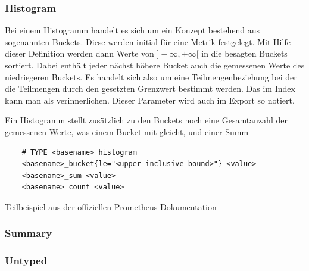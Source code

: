 \subsubsection{Histogram}
Bei einem Histogramm handelt es sich um ein Konzept bestehend aus sogenannten Buckets. Diese werden initial für eine Metrik festgelegt. Mit Hilfe dieser Definition werden dann Werte von $]-\infty,+\infty[$  in die besagten Buckets sortiert. Dabei enthält jeder nächst höhere Bucket auch die gemessenen Werte des niedriegeren Buckets. Es handelt sich also um eine Teilmengenbeziehung bei der die Teilmengen durch den gesetzten Grenzwert bestimmt werden. Das  im Index kann man als  verinnerlichen. Dieser Parameter wird auch im Export so notiert. 
\begin{center}
\end{center}
Ein Histogramm stellt zusätzlich zu den Buckets noch eine Gesamtanzahl der gemessenen Werte, was einem Bucket mit  gleicht, und einer Summ
\begin{listing}[h]
	\begin{verbatim}
	# TYPE <basename> histogram
	<basename>_bucket{le="<upper inclusive bound>"} <value>
	<basename>_sum <value>
	<basename>_count <value>
	\end{verbatim}
	\caption{Teilbeispiel aus der offiziellen Prometheus Dokumentation~\cite{PrometheusExpositionFormatBeispiel}}
\end{listing}
\subsubsection{Summary}
\subsubsection{Untyped}

\clearpage
